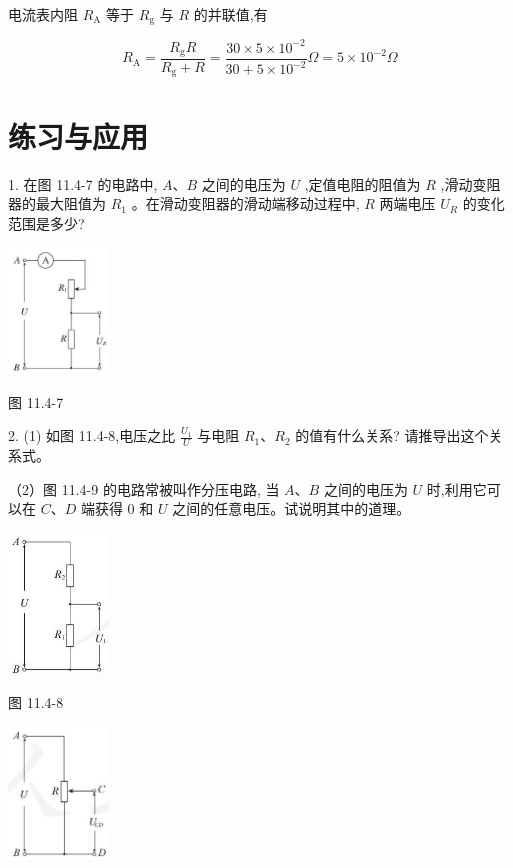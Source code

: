 \documentclass[10pt]{article}
\begin{document}
电流表内阻 \({R}_{\mathrm{A}}\) 等于 \({R}_{\mathrm{g}}\) 与 \(R\) 的并联值,有

\[
{R}_{\mathrm{A}} = \frac{{R}_{\mathrm{g}}R}{{R}_{\mathrm{g}} + R} = \frac{{30} \times 5 \times {10}^{-2}}{{30} + 5 \times {10}^{-2}}\Omega = 5 \times {10}^{-2}\Omega
\]

\section*{练习与应用}

1. 在图 11.4-7 的电路中, \(A\text{、}B\) 之间的电压为 \(U\) ,定值电阻的阻值为 \(R\) ,滑动变阻器的最大阻值为 \({R}_{1}\) 。在滑动变阻器的滑动端移动过程中, \(R\) 两端电压 \({U}_{R}\) 的变化范围是多少?

\begin{center}
\includegraphics[max width=0.2\textwidth]{images/01911d5f-8e38-70c0-b5b8-2b399bd115b6_76_922362.jpg}
\end{center}

图 11.4-7

2. (1) 如图 11.4-8,电压之比 \(\frac{{U}_{1}}{U}\) 与电阻 \({R}_{1}\text{、}{R}_{2}\) 的值有什么关系? 请推导出这个关系式。

（2）图 11.4-9 的电路常被叫作分压电路, 当 \(A\text{、}B\) 之间的电压为 \(U\) 时,利用它可以在 \(C\text{、}D\) 端获得 0 和 \(U\) 之间的任意电压。试说明其中的道理。

\begin{center}
\includegraphics[max width=0.2\textwidth]{images/01911d5f-8e38-70c0-b5b8-2b399bd115b6_76_307337.jpg}
\end{center}

图 11.4-8

\begin{center}
\includegraphics[max width=0.2\textwidth]{images/01911d5f-8e38-70c0-b5b8-2b399bd115b6_76_567708.jpg}
\end{center}
\end{document}
